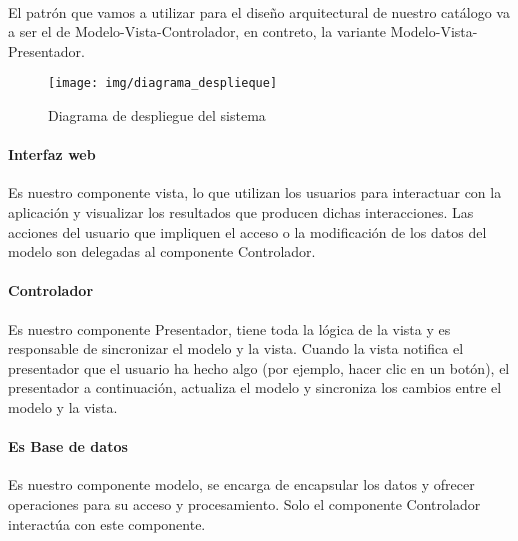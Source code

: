 \paragraph{}El patrón que vamos a utilizar para el diseño arquitectural de nuestro 
catálogo va a ser el de Modelo-Vista-Controlador, en contreto, la variante Modelo-Vista-Presentador.

\vspace{.2cm}
\begin{figure}[h!]
 \centering
 \texttt{[image: img/diagrama\_desplieque]}
 \caption{Diagrama de despliegue del sistema}
\end{figure}
\vspace{.2cm}


\paragraph{Interfaz web}Es nuestro componente vista, lo que utilizan los usuarios para 
interactuar con la aplicación y visualizar los resultados que producen dichas
interacciones. Las acciones del usuario que impliquen el acceso o la modificación
de los datos del modelo son delegadas al componente Controlador.

\paragraph{Controlador}Es nuestro componente Presentador, tiene toda la lógica de la vista 
y es responsable de sincronizar el modelo y la vista. Cuando la vista notifica el 
presentador que el usuario ha hecho algo (por ejemplo, hacer clic en un botón), 
el presentador a continuación, actualiza el modelo y sincroniza los cambios 
entre el modelo y la vista.

\paragraph{Es Base de datos}Es nuestro componente modelo, se encarga de encapsular 
los datos y ofrecer operaciones para su acceso y procesamiento. Solo el componente
Controlador interactúa con este componente.